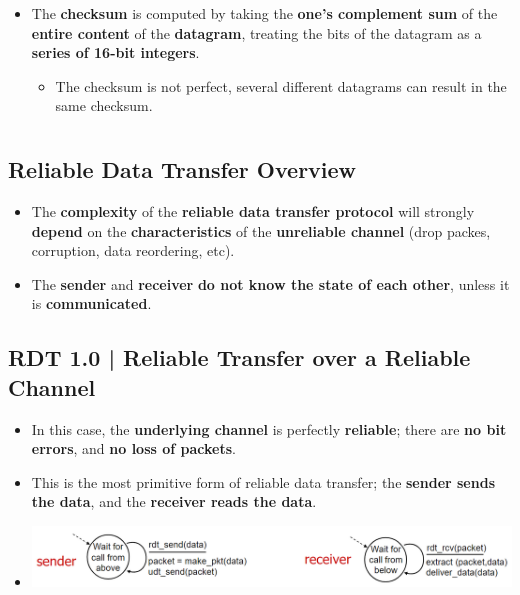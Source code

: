 \documentclass{article}
\begin{document}
\begin{itemize}
\begin{enumerate}
        \end{enumerate} 
        \item The \textbf{checksum} is computed by taking the \textbf{one's complement sum} of the \textbf{entire content} of the \textbf{datagram}, treating the bits of the datagram as a \textbf{series of 16-bit integers}.
        \begin{itemize}
            \item The checksum is not perfect, several different datagrams can result in the same checksum.
        \end{itemize}
    \end{itemize}

    \section*{}

    \subsection*{Reliable Data Transfer Overview}
    \begin{itemize}
        \item The \textbf{complexity} of the \textbf{reliable data transfer protocol} will strongly \textbf{depend} on the \textbf{characteristics} of the \textbf{unreliable channel} (drop packes, corruption, data reordering, etc).
        \item The \textbf{sender} and \textbf{receiver} \textbf{do not know the state of each other}, unless it is \textbf{communicated}.
    \end{itemize}

    \subsection*{RDT 1.0 | Reliable Transfer over a Reliable Channel}
    \begin{itemize}
        \item In this case, the \textbf{underlying channel} is perfectly \textbf{reliable}; there are \textbf{no bit errors}, and \textbf{no loss of packets}.
        \item This is the most primitive form of reliable data transfer; the \textbf{sender sends the data}, and the \textbf{receiver reads the data}.
        \item[] \includegraphics*[width=\textwidth - 25pt]{images/RDT-1.0.PNG}
    \end{itemize}
    
\end{document}
